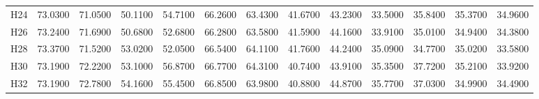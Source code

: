 \begin{table}[tbp]
\begin{tabular}{lrrrrrrrrrrrr}
H24 & 73.0300 & 71.0500 & 50.1100 & 54.7100 & 66.2600 & 63.4300 & 41.6700 & 43.2300 & 33.5000 & 35.8400 & 35.3700 & 34.9600 \\
H26 & 73.2400 & 71.6900 & 50.6800 & 52.6800 & 66.2800 & 63.5800 & 41.5900 & 44.1600 & 33.9100 & 35.0100 & 34.9400 & 34.3800 \\
H28 & 73.3700 & 71.5200 & 53.0200 & 52.0500 & 66.5400 & 64.1100 & 41.7600 & 44.2400 & 35.0900 & 34.7700 & 35.0200 & 33.5800 \\
H30 & 73.1900 & 72.2200 & 53.1000 & 56.8700 & 66.7700 & 64.3100 & 40.7400 & 43.9100 & 35.3500 & 37.7200 & 35.2100 & 33.9200 \\
H32 & 73.1900 & 72.7800 & 54.1600 & 55.4500 & 66.8500 & 63.9800 & 40.8800 & 44.8700 & 35.7700 & 37.0300 & 34.9900 & 34.4900 \\
\bottomrule
\end{tabular}
\end{table}
